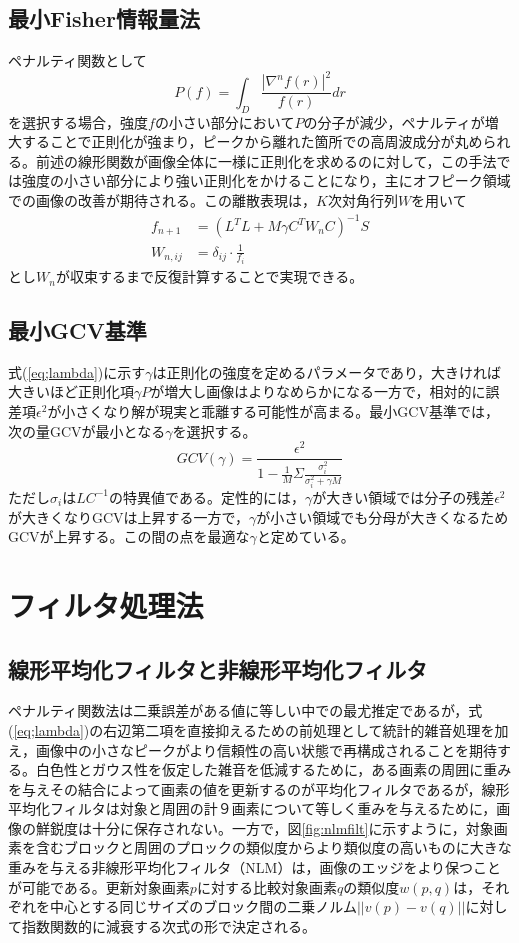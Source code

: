 \subsection{最小Fisher情報量法}
ペナルティ関数として
\begin{equation}
	P(f) = \int_{D}\frac{|\nabla^nf(r)|^2}{f(r)}dr
\end{equation}
を選択する場合\cite{fisher}，強度$f$の小さい部分において$P$の分子が減少，ペナルティが増大することで正則化が強まり，ピークから離れた箇所での高周波成分が丸められる。前述の線形関数が画像全体に一様に正則化を求めるのに対して，この手法では強度の小さい部分により強い正則化をかけることになり，主にオフピーク領域での画像の改善が期待される。この離散表現は，$K$次対角行列$W$を用いて
\begin{align}
	f_{n+1} &= (L^{T}L + M\gamma C^{T}W_{n}C)^{-1}S\\
	W_{n, ij} &= \delta_{ij} \cdot \frac{1}{f_{i}}
\end{align}
とし$W_n$が収束するまで反復計算することで実現できる。
\subsection{最小GCV基準}
式(\ref{eq;lambda})に示す$\gamma$は正則化の強度を定めるパラメータであり，大きければ大きいほど正則化項$\gamma P$が増大し画像はよりなめらかになる一方で，相対的に誤差項$\epsilon^2$が小さくなり解が現実と乖離する可能性が高まる。最小GCV基準では，次の量GCVが最小となる$\gamma$を選択する。
\begin{equation}
	GCV(\gamma) = \frac{\epsilon^2}{1 - \frac{1}{M}\Sigma \frac{\sigma_i^2}{\sigma_i^2 + \gamma M}}
\end{equation}
ただし$\sigma_i$は$LC^{-1}$の特異値である。定性的には，$\gamma$が大きい領域では分子の残差$\epsilon^2$が大きくなりGCVは上昇する一方で，$\gamma$が小さい領域でも分母が大きくなるためGCVが上昇する。この間の点を最適な$\gamma$と定めている。
\section{フィルタ処理法}
\subsection{線形平均化フィルタと非線形平均化フィルタ}
ペナルティ関数法は二乗誤差がある値に等しい中での最尤推定であるが，式(\ref{eq;lambda})の右辺第二項を直接抑えるための前処理として統計的雑音処理を加え，画像中の小さなピークがより信頼性の高い状態で再構成されることを期待する。白色性とガウス性を仮定した雑音を低減するために，ある画素の周囲に重みを与えその結合によって画素の値を更新するのが平均化フィルタであるが，線形平均化フィルタは対象と周囲の計９画素について等しく重みを与えるために，画像の鮮鋭度は十分に保存されない。一方で，図\ref{fig:nlmfilt}に示すように，対象画素を含むブロックと周囲のプロックの類似度からより類似度の高いものに大きな重みを与える非線形平均化フィルタ（NLM）は，画像のエッジをより保つことが可能である。更新対象画素$p$に対する比較対象画素$q$の類似度$w(p, q)$は，それぞれを中心とする同じサイズのブロック間の二乗ノルム$||v(p) - v(q)||$に対して指数関数的に減衰する次式の形で決定される。\cite{nlmfilter}

